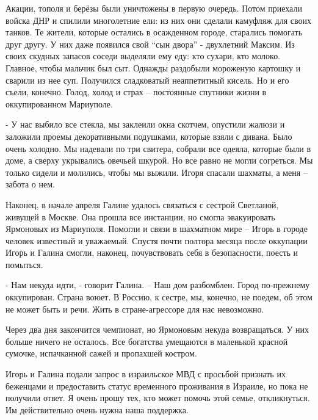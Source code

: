 Акации, тополя и берёзы были уничтожены в первую очередь. Потом приехали войска
ДНР и спилили многолетние ели: из них они сделали камуфляж для своих танков. Те
жители, которые остались в осажденном городе, старались помогать друг другу. У
них даже появился свой \enquote{сын двора} - двухлетний Максим. Из своих скудных
запасов соседи выделяли ему еду: кто сухари, кто молоко. Главное, чтобы мальчик
был сыт. Однажды раздобыли мороженую картошку и сварили из нее суп. Получился
сладковатый неаппетитный кисель. Но и его съели, конечно. Голод, холод и страх
– постоянные спутники жизни  в оккупированном Мариуполе.

- У нас выбило все стекла, мы заклеили окна скотчем, опустили жалюзи и заложили
проемы декоративными подушками, которые взяли с дивана. Было очень холодно. Мы
надевали по три свитера, собрали все одеяла, которые были в доме, а сверху
укрывались овечьей шкурой. Но все равно не могли согреться. Мы только сидели и
молились, чтобы мы выжили. Игоря спасали шахматы, а меня – забота о нем. 

Наконец, в начале апреля Галине удалось связаться с сестрой Светланой, живущей
в Москве. Она прошла все инстанции, но смогла эвакуировать Ярмоновых из
Мариуполя. Помогли и связи в шахматном мире – Игорь в городе человек известный
и уважаемый. Спустя почти полтора месяца после оккупации Игорь и Галина смогли,
наконец, почувствовать себя в безопасности, поесть и помыться. 

- Нам некуда идти, - говорит Галина. – Наш дом разбомблен. Город по-прежнему
оккупирован. Страна воюет. В Россию, к сестре, мы, конечно, не поедем, об этом
не может быть и речи. Жить в стране-агрессоре для нас невозможно.

Через два дня закончится чемпионат, но Ярмоновым некуда возвращаться. У них
больше ничего не осталось. Все богатства умещаются в маленькой красной
сумочке, испачканной сажей и пропахшей костром. 

Игорь и Галина подали запрос в израильское МВД с просьбой признать их беженцами
и предоставить статус временного проживания в Израиле, но пока не получили
ответ. Я очень прошу тех, кто может помочь этой семье, откликнуться. Им
действительно очень нужна наша поддержка.

